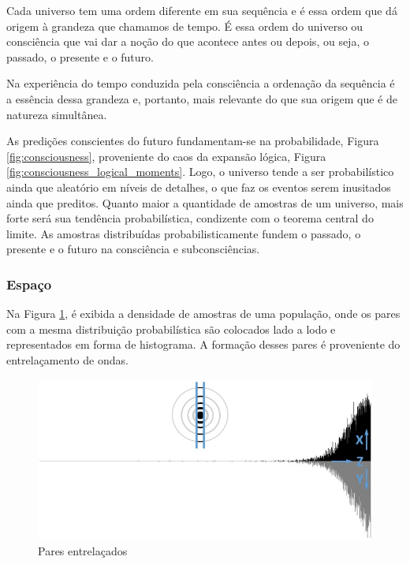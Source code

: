 Cada universo tem uma ordem diferente em sua sequência e é essa ordem que dá origem à grandeza que chamamos de tempo. É essa ordem do universo ou consciência que vai dar a noção do que acontece antes ou depois, ou seja, o passado, o presente e o futuro. 

Na experiência do tempo conduzida pela consciência a ordenação da sequência é a essência dessa grandeza e, portanto, mais relevante do que sua origem que é de natureza simultânea.

As predições conscientes do futuro fundamentam-se na probabilidade, Figura \ref{fig:consciousness}, proveniente do caos da expansão lógica, Figura \ref{fig:consciousness_logical_moments}. Logo, o universo tende a ser probabilístico ainda que aleatório em níveis de detalhes, o que faz os eventos serem inusitados ainda que preditos. Quanto maior a quantidade de amostras de um universo, mais forte será sua tendência probabilística, condizente com o teorema central do limite. As amostras distribuídas probabilisticamente fundem o passado, o presente e o futuro na consciência e subconsciências. 

\subsubsection{Espaço}
Na Figura \ref{fig:consciousness_space_waves}, é exibida a densidade de amostras de uma população, onde os pares com a mesma distribuição probabilística são colocados lado a lodo e representados em forma de histograma. A formação desses pares é proveniente do entrelaçamento de ondas.
	\begin{figure}[H]
	\caption{Pares entrelaçados}
	\label{fig:consciousness_space_waves}
	\centering
	\includegraphics[scale=.7]{sections/images/consciousness_space_waves.jpg}
	\end{figure}

